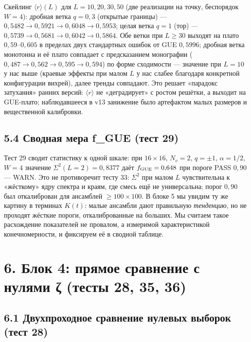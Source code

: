 \documentclass[
]{article}
\begin{document}
Скейлинг \(\langle r\rangle(L)\) для \(L = 10, 20, 30, 50\) (две
реализации на точку, беспорядок \(W=4\)): дробная ветка \(q=0{,}3\)
(открытые границы) ---
\(0{,}5482 \to 0{,}5921 \to 0{,}6048 \to 0{,}5953\); целая ветка \(q=1\)
(тор) --- \(0{,}5739 \to 0{,}5681 \to 0{,}6042 \to 0{,}5864\). Обе ветки
при \(L\ge30\) выходят на плато \(0{,}59\)--\(0{,}605\) в пределах двух
стандартных ошибок от GUE \(0{,}5996\); дробная ветка монотонна и её
плато совпадает с предсказанием монографии
(\(0{,}487\to0{,}562\to0{,}595\to0{,}594\)) по форме сходимости ---
значение при \(L=10\) у нас выше (краевые эффекты при малом \(L\) у нас
слабее благодаря конкретной конфигурации вихрей), далее тренды
совпадают. Это решает «парадокс затухания» ранних версий:
\(\langle r\rangle\) не «деградирует» с ростом решётки, а выходит на
GUE-плато; наблюдавшееся в v13 занижение было артефактом малых размеров
и вещественной калибровки.

\subsection{5.4 Сводная мера f\_GUE (тест
29)}\label{ux441ux432ux43eux434ux43dux430ux44f-ux43cux435ux440ux430-f_gue-ux442ux435ux441ux442-29}

Тест 29 сводит статистику к одной шкале: при \(16\times16\), \(N_v=2\),
\(q=\pm1\), \(\alpha=1/2\), \(W=4\) значение
\(\Sigma^2(L{=}2) = 0{,}8377\) даёт \(f_{\rm GUE} = 0{,}648\) при пороге
PASS \(0{,}90\) --- WARN. Это не противоречит тесту 33: \(\Sigma^2\) при
малом \(L\) чувствительна к «жёсткому» ядру спектра и краям, где смесь
ещё не универсальна; порог \(0{,}90\) был откалиброван для ансамблей
\(\ge100\times100\). В блоке 5 мы увидим ту же картину в терминах
\(K(t)\): малые ансамбли дают правильную \emph{тенденцию}, но не
проходят жёсткие пороги, откалиброванные на больших. Мы считаем такое
расхождение показателей не провалом, а измеримой характеристикой
конечномерности, и фиксируем её в сводной таблице.

\section{6. Блок 4: прямое сравнение с нулями ζ (тесты 28, 35,
36)}\label{ux431ux43bux43eux43a-4-ux43fux440ux44fux43cux43eux435-ux441ux440ux430ux432ux43dux435ux43dux438ux435-ux441-ux43dux443ux43bux44fux43cux438-ux3b6-ux442ux435ux441ux442ux44b-28-35-36}

\subsection{6.1 Двухпроходное сравнение нулевых выборок (тест
28)}\label{ux434ux432ux443ux445ux43fux440ux43eux445ux43eux434ux43dux43eux435-ux441ux440ux430ux432ux43dux435ux43dux438ux435-ux43dux443ux43bux435ux432ux44bux445-ux432ux44bux431ux43eux440ux43eux43a-ux442ux435ux441ux442-28}
\end{document}
